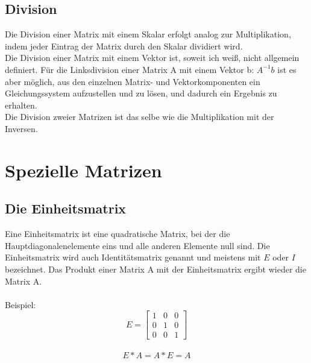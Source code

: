 \documentclass[11pt]{scrreprt}
\begin{document}
\subsection{Division}
Die Division einer Matrix mit einem Skalar erfolgt analog zur Multiplikation, indem jeder Eintrag der Matrix durch den Skalar dividiert wird.\\
Die Division einer Matrix mit einem Vektor ist, soweit ich weiß, nicht allgemein definiert. Für die Linksdivision einer Matrix A mit einem Vektor b: $A^{-1}b$ ist es aber möglich, aus den einzelnen Matrix- und Vektorkomponenten ein Gleichungssystem aufzustellen und zu lösen, und dadurch ein Ergebnis zu erhalten.\\
Die Division zweier Matrizen ist das selbe wie die Multiplikation mit der Inversen.

\section{Spezielle Matrizen}
\subsection{Die Einheitsmatrix}
Eine Einheitsmatrix ist eine quadratische Matrix, bei der die Hauptdiagonalenelemente eins und alle anderen Elemente null sind.
Die Einheitsmatrix wird auch Identitätsmatrix genannt und meistens mit $E$ oder $I$ bezeichnet. Das Produkt einer Matrix A mit der Einheitsmatrix ergibt wieder die Matrix A.\\
\\
Beispiel:
\begin{equation}
E =
\begin{bmatrix}
1 & 0 & 0 \\
0 & 1 & 0 \\
0 & 0 & 1 
\end {bmatrix}
\end{equation}\\
\begin{equation}
E*A = A*E = A
\end{equation}
\end{document}
